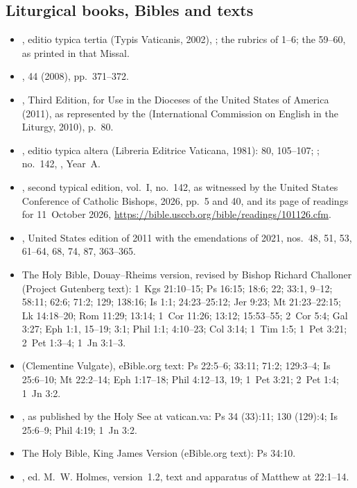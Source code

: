 {\small
\subsection*{Liturgical books, Bibles and texts}
\begin{itemize}[itemsep=0pt,topsep=.25em]
\item {}, editio typica tertia (Typis Vaticanis, 2002), ; the rubrics of  1--6; the  59--60, as printed in that Missal.
\item {},  44 (2008), pp.~371--372.
\item {}, Third Edition, for Use in the Dioceses of the United States of America (2011), as represented by the  (International Commission on English in the Liturgy, 2010), p.~80.
\item {}, editio typica altera (Libreria Editrice Vaticana, 1981):  80, 105--107; ; no.~142, , Year~A.
\item {}, second typical edition, vol.~I, no.~142, as witnessed by the United States Conference of Catholic Bishops,  2026, pp.~5 and 40, and its page of readings for 11~October 2026, \url{https://bible.usccb.org/bible/readings/101126.cfm}.
\item {}, United States edition of 2011 with the emendations of 2021, nos.~48, 51, 53, 61--64, 68, 74, 87, 363--365.
\item The Holy Bible, Douay--Rheims version, revised by Bishop Richard Challoner (Project Gutenberg text): 1~Kgs 21:10--15; Ps 16:15; 18:6; 22; 33:1, 9--12; 58:11; 62:6; 71:2; 129; 138:16; Is 1:1; 24:23--25:12; Jer 9:23; Mt 21:23--22:15; Lk 14:18--20; Rom 11:29; 13:14; 1~Cor 11:26; 13:12; 15:53--55; 2~Cor 5:4; Gal 3:27; Eph 1:1, 15--19; 3:1; Phil 1:1; 4:10--23; Col 3:14; 1~Tim 1:5; 1~Pet 3:21; 2~Pet 1:3--4; 1~Jn 3:1--3.
\item {} (Clementine Vulgate), eBible.org text: Ps 22:5--6; 33:11; 71:2; 129:3--4; Is 25:6--10; Mt 22:2--14; Eph 1:17--18; Phil 4:12--13, 19; 1~Pet 3:21; 2~Pet 1:4; 1~Jn 3:2.
\item {}, as published by the Holy See at vatican.va: Ps 34 (33):11; 130 (129):4; Is 25:6--9; Phil 4:19; 1~Jn 3:2.
\item The Holy Bible, King James Version (eBible.org text): Ps 34:10.
\item {}, ed. M.~W. Holmes, version~1.2, text and apparatus of Matthew at 22:1--14.
\end{itemize}

}
